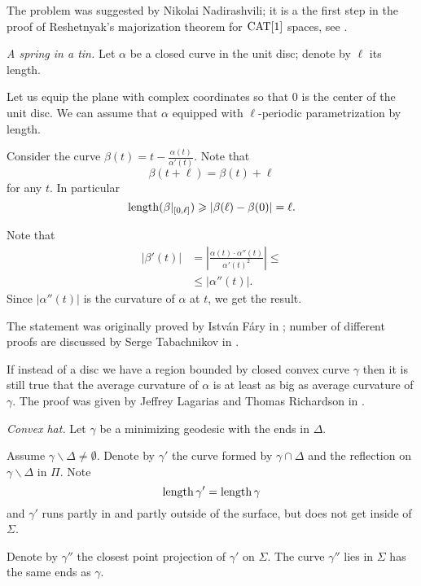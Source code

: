 The problem was suggested by Nikolai Nadirashvili;
it is a the first step 
in the proof of Reshetnyak's majorization theorem for $\operatorname{\rm CAT}\nolimits[1]$ spaces, see \cite{akp}.
 


 \textit{A spring in a tin.}
Let $\alpha$ be a closed curve in the unit disc;
denote by $\ell$ its length.

Let us equip the plane with complex coordinates so that $0$ is the center of the unit disc.
We can assume that $\alpha$ equipped with $\ell$-periodic parametrization by length.

Consider the curve $\beta(t)=t-\tfrac{\alpha(t)}{\alpha'(t)}$.
Note that 
\[\beta(t+\ell)=\beta(t)+\ell\] 
for any $t$.
In particular 
\[\operatorname{\rm length} (\beta|_{[0,\ell]}) 
\geqslant 
|\beta(\ell)-\beta(0)|
=
\ell.\]

Note that 
\begin{align*}
|\beta'(t)|&=|\tfrac{\alpha(t)\cdot\alpha''(t)}{\alpha'(t)^2}|\le
\\
&\le|\alpha''(t)|.
\end{align*}
Since $|\alpha''(t)|$ is the curvature of $\alpha$ at $t$,
we get the result.

The statement was originally proved 
by Istv{\'a}n F{\'a}ry in \cite{fary};
number of different proofs are discussed by Serge Tabachnikov in \cite{tabachnikov}.

If instead of a disc we have a region bounded by closed convex curve $\gamma$ then it is still true that the average curvature of $\alpha$ is at least as big as average curvature of $\gamma$. 
The proof was given by Jeffrey Lagarias
and Thomas Richardson in \cite{lagarias-richardson}.


\textit{Convex hat.}
Let $\gamma$ be a minimizing geodesic with the ends in $\Delta$.

Assume $\gamma\backslash\Delta\ne\emptyset$.
Denote by $\gamma'$ the curve formed by $\gamma\cap \Delta$ 
and the reflection on $\gamma\backslash\Delta$ in $\Pi$.
Note 
\[\operatorname{\rm length}\gamma'=\operatorname{\rm length}\gamma\]
and $\gamma'$ runs partly in and partly outside of the surface, but does not get inside of $\Sigma$.

Denote by $\gamma''$ the closest point projection of $\gamma'$ on $\Sigma$.
The curve $\gamma''$ lies in $\Sigma$ has the same ends as $\gamma$.


